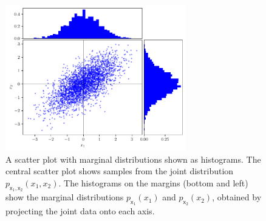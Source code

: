 \begin{figure}[h!]
    \centering
    \includegraphics[width=0.7\textwidth]{figs/probability/marginalization.pdf}
    \caption{A scatter plot with marginal distributions shown as histograms. The central scatter plot shows samples from the joint distribution $p_{\mathsf{x}_1, \mathsf{x}_2}(x_1, x_2)$. The histograms on the margins (bottom and left) show the marginal distributions $p_{\mathsf{x}_1}(x_1)$ and $p_{\mathsf{x}_2}(x_2)$, obtained by projecting the joint data onto each axis.}
    \label{fig:marginalization}
\end{figure}

